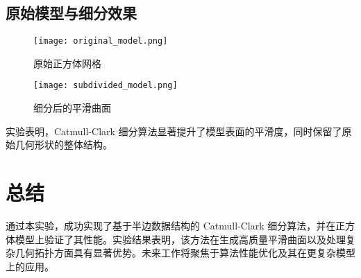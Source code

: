 \documentclass[a4paper,12pt]{article}
\begin{document}
\subsection*{原始模型与细分效果}
\begin{figure}[h!]
    \centering
    \texttt{[image: original\_model.png]}
    \caption{原始正方体网格}
\end{figure}

\begin{figure}[h!]
    \centering
    \texttt{[image: subdivided\_model.png]}
    \caption{细分后的平滑曲面}
\end{figure}

实验表明，Catmull-Clark 细分算法显著提升了模型表面的平滑度，同时保留了原始几何形状的整体结构。



\section{总结}
通过本实验，成功实现了基于半边数据结构的 Catmull-Clark 细分算法，并在正方体模型上验证了其性能。实验结果表明，该方法在生成高质量平滑曲面以及处理复杂几何拓扑方面具有显著优势。未来工作将聚焦于算法性能优化及其在更复杂模型上的应用。
\end{document}
